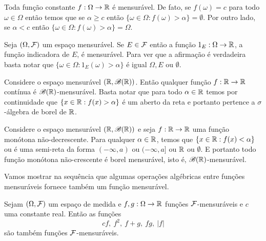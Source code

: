 \begin{exemplo}\label{exemplo-func-const.mensuravel}
	Toda função constante $f:\Omega\to\mathbb{R}$ é mensurável.
	De fato, se $f(\omega)=c$ para todo $\omega\in\Omega$ 
	então temos que se $\alpha\geq c$ então 
	$\{\omega\in\Omega: f(\omega)>\alpha\} =\emptyset$.
	Por outro lado, se $\alpha<c$ então 
	$\{\omega\in\Omega: f(\omega)>\alpha\} =\Omega$.
\end{exemplo}





\begin{exemplo}
	Seja $(\Omega,\mathcal{F})$ um espaço mensurável. 
	Se $E\in\mathcal{F}$ então a função $1_E:\Omega\to\mathbb{R}$, a função indicadora de $E$,
	é mensurável.
	Para ver que a afirmação é verdadeira basta notar que 
	$\{\omega\in\Omega: 1_{E}(\omega)>\alpha \}$ é igual $\Omega, E$
	ou $\emptyset$.
\end{exemplo}



\begin{exemplo}
	Considere o espaço mensurável $(\mathbb{R},\mathscr{B}(\mathbb{R}))$. 
	Então qualquer função $f:\mathbb{R}\to\mathbb{R}$ contínua é 
	$\mathscr{B}(\mathbb{R})$-mensurável.
	Basta notar que para todo $\alpha\in \mathbb{R}$ temos
	por continuidade que $\{x\in\mathbb{R}: f(x)>\alpha\}$ é 
	um aberto da reta e portanto pertence a $\sigma$-álgebra
	de borel de $\mathbb{R}$.
\end{exemplo}




\begin{exemplo}
	Considere o espaço mensurável $(\mathbb{R},\mathscr{B}(\mathbb{R}))$ e 
	seja $f:\mathbb{R}\to\mathbb{R}$ uma função monótona não-decrescente.
	Para qualquer $\alpha\in\mathbb{R}$, 
	temos que $\{x\in\mathbb{R}: f(x)<\alpha\}$ ou é uma semi-reta
	da forma $(-\infty,a)$ ou $(-\infty,a]$ ou $\mathbb{R}$ ou $\emptyset$.
	E portanto todo função monótona não-crescente é borel 
	mensurável, isto é, $\mathscr{B}(\mathbb{R})$-mensurável.
\end{exemplo}


Vamos mostrar na sequência que algumas operações algébricas
entre funções mensuráveis fornece também um função mensurável.

\begin{lema}
	Sejam $(\Omega,\mathcal{F})$ um espaço de medida e 
	$f,g:\Omega\to\mathbb{R}$ funções $\mathcal{F}$-mensuráveis 
	e $c$ uma constante real. Então as funções 
	\[
		cf,\ f^2,\ f+g,\ fg,\ |f|
	\]
 	são também funções $\mathcal{F}$-mensuráveis.
\end{lema} 



